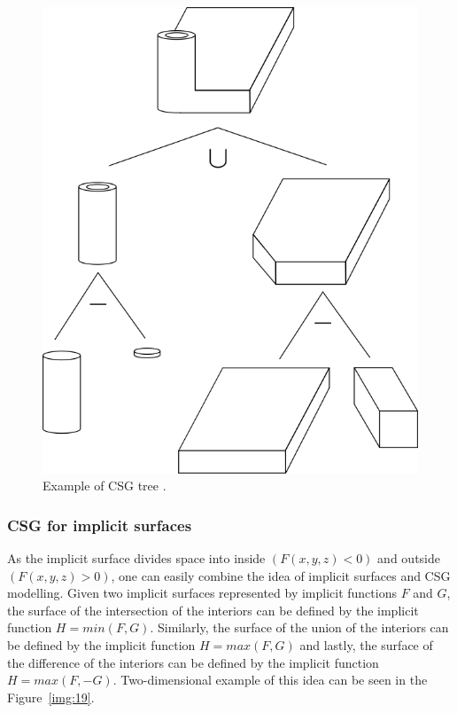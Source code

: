\begin{figure}
    \centerline{\includegraphics[scale=0.5]{images/img18}}
    \caption[Example of CSG tree]
    {Example of CSG tree \cite{foley1996computer}.}
    \label{img:18}
\end{figure}

\subsubsection*{CSG for implicit surfaces}
As the implicit surface divides space into inside $(F(x, y, z) < 0)$ and
outside $(F(x, y, z) > 0)$, one can easily combine the idea of
implicit surfaces and CSG modelling. Given two implicit surfaces represented
by implicit functions $F$ and $G$, the surface of the
intersection of the interiors can be defined by the implicit function $H=min(F, G)$.
Similarly, the surface of the union of the interiors can be defined
by the implicit function $H=max(F, G)$ and lastly, the surface of the difference of
the interiors can be defined by the implicit function $H=max(F, -G)$. Two-dimensional
example of this idea can be seen in the Figure~\ref{img:19}.

